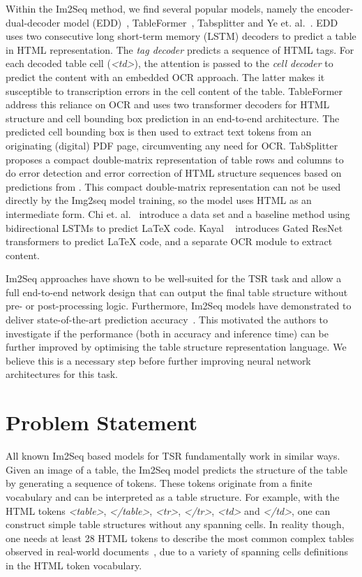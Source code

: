 \documentclass[runningheads]{llncs}
\begin{document}
Within the Im2Seq method, we find several popular models, namely the encoder-dual-decoder model (EDD)~\cite{PubTabNet}, TableFormer~\cite{TableFormer}, Tabsplitter\cite{identity_matrix} and Ye et. al.~\cite{TableMaster}. EDD uses two consecutive long short-term memory (LSTM) decoders to predict a table in HTML representation. The \textit{tag decoder} predicts a sequence of HTML tags. For each decoded table cell (\textit{<td>}), the attention is passed to the \textit{cell decoder} to predict the content with an embedded OCR approach. The latter makes it susceptible to transcription errors in the cell content of the table. TableFormer address this reliance on OCR and uses two transformer decoders for HTML structure and cell bounding box prediction in an end-to-end architecture. The predicted cell bounding box is then used to extract text tokens from an originating (digital) PDF page, circumventing any need for OCR. TabSplitter \cite{identity_matrix} proposes a compact double-matrix representation of table rows and columns to do error detection and error correction of HTML structure sequences based on predictions from \cite{TableMaster}. This compact double-matrix representation can not be used directly by the Img2seq model training, so the model uses HTML as an intermediate form. Chi et. al.~\cite{deng2019challenges} introduce a data set and a baseline method using bidirectional LSTMs to predict LaTeX code. Kayal ~\cite{kayal2022tables} introduces Gated ResNet transformers to predict LaTeX code, and a separate OCR module to extract content. 

Im2Seq approaches have shown to be well-suited for the TSR task and allow a full end-to-end network design that can output the final table structure without pre- or post-processing logic. Furthermore, Im2Seq models have demonstrated to deliver state-of-the-art prediction accuracy~\cite{TableFormer}. This motivated the authors to investigate if the performance (both in accuracy and inference time) can be further improved by optimising the table structure representation language. We believe this is a necessary step before further improving neural network architectures for this task.

\section{\label{PS}Problem Statement} 

All known Im2Seq based models for TSR fundamentally work in similar ways. Given an image of a table, the Im2Seq model predicts the structure of the table by generating a sequence of tokens. These tokens originate from a finite vocabulary and can be interpreted as a table structure. For example, with the HTML tokens \textit{<table>}, \textit{</table>}, \textit{<tr>}, \textit{</tr>}, \textit{<td>} and \textit{</td>}, one can construct simple table structures without any spanning cells. In reality though, one needs at least 28 HTML tokens to describe the most common complex tables observed in real-world documents~\cite{GTE,PubTabNet}, due to a variety of spanning cells definitions in the HTML token vocabulary. 
\end{document}
